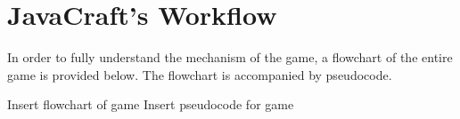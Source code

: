 \section{JavaCraft's Workflow} \label{section: javacraft workflow}
In order to fully understand the mechanism of the game, a flowchart of the entire game is provided below. The flowchart is accompanied by pseudocode.

Insert flowchart of game
Insert pseudocode for game
